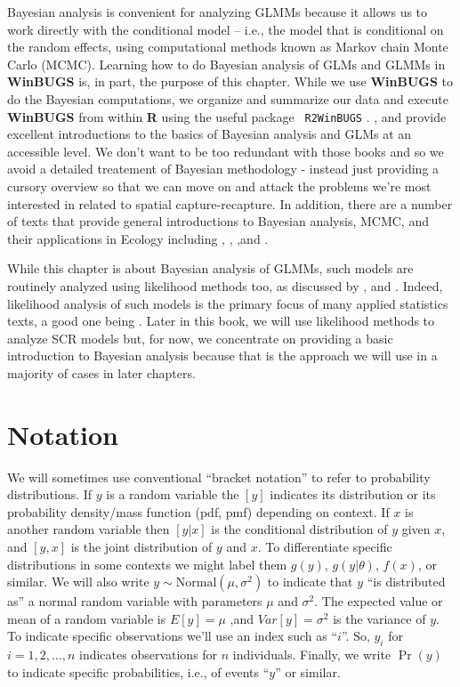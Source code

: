 Bayesian analysis is convenient for analyzing GLMMs because it allows
us to work directly with the conditional model -- i.e., the model that
is conditional on the random effects, using computational methods
known as Markov chain Monte Carlo (MCMC). Learning how to do Bayesian
analysis of GLMs and GLMMs in {\bf WinBUGS} is, in part, the purpose
of this chapter.  While we use {\bf WinBUGS} to do the Bayesian
computations, we organize and summarize our data and execute {\bf
  WinBUGS} from within {\bf R} using the useful package \mbox{\tt
  R2WinBUGS} \citep{sturtz_etal:2005}.  \citet{kery:2010}, and
\citet{kery_schaub:2011} provide excellent introductions to the basics
of Bayesian analysis and GLMs at an accessible level. We don't want to
be too redundant with those books and so we avoid a detailed
treatement of Bayesian methodology - instead just providing a cursory
overview so that we can move on and attack the problems we're most
interested in related to spatial capture-recapture.  In addition,
there are a number of texts that provide general introductions to
Bayesian analysis, MCMC, and their applications in Ecology including
\citet{mccarthy:2007}, \citet{kery:2010}, \citet{link_barker:2009},and
\citet{king_etal:2009}.


While this chapter is about Bayesian analysis of GLMMs, such models
are routinely analyzed using likelihood methods too, as discussed by
\citet{royle_dorazio:2008}, and \citet{kery:2010}. Indeed, likelihood
analysis of such models is the primary focus of many applied
statistics texts, a good one being \citet{zuur_etal:2009}. Later in
this book, we will use likelihood methods to analyze SCR models but,
for now, we concentrate on providing a basic introduction to Bayesian
analysis because that is the approach we will use in a majority of
cases in later chapters.


\section{ Notation}

We will sometimes use conventional ``bracket notation'' to refer to
probability distributions. If $y$ is a random variable the $[y]$
indicates its distribution or its probability density/mass function
(pdf, pmf) depending on context. If $x$ is another random variable
then $[y|x]$ is the conditional distribution of $y$ given $x$, and
$[y,x]$ is the joint distribution of $y$ and $x$. To differentiate
specific distributions in some contexts we might label them $g(y)$,
$g(y|\theta)$, $f(x)$, or similar. We will also write $y \sim
\mbox{Normal}(\mu,\sigma^{2})$ to indicate that $y$ ``is distributed as'' a normal
random variable with parameters $\mu$ and $\sigma^{2}$. The expected value
or mean of a random variable is $E[y] = \mu$ ,and $Var[y] = \sigma^{2}$ is
the variance of $y$.  To indicate specific observations we'll use an
index such as ``$i$''. So, $y_{i}$ for $i=1,2,\ldots,n$ indicates
observations for $n$ individuals. Finally, we write $\Pr(y)$ to indicate specific probabilities, i.e., of events ``$y$'' or similar. 



